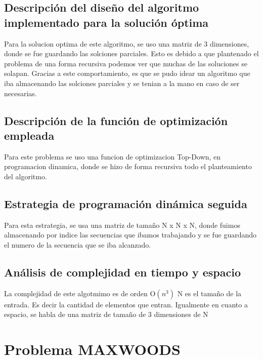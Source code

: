 \documentclass[a4paper,10pt]{article}
\begin{document}
  \subsection{Descripción del diseño del algoritmo implementado para la solución óptima}
  \hspace{2cm}
  Para la solucion optima de este algoritmo, se uso una matriz de 3 dimensiones, donde se fue guardando las solciones parciales. Esto es debido a que plantenado el problema de una forma recursiva podemos ver que muchas de las soluciones se solapan. Gracias a este comportamiento, es que se pudo idear un algoritmo que iba almacenando las solciones parciales y se tenian a la mano en caso de ser necesarias. 


  \subsection{Descripción de la función de optimización empleada}
  \hspace{2cm}
    Para este problema se uso una funcion de optimizacion Top-Down, en programacion dinamica, donde se hizo de forma recursiva todo el planteamiento del algoritmo.
    
  \subsection{Estrategia de programación dinámica seguida}
  \hspace{2cm}
    
Para esta estrategia, se usa una matriz de tamaño N x N x N, donde fuimos almacenando por indice las secuencias que ibamos trabajando y se fue guardando el numero de la secuencia que se iba alcanzado.

  \subsection{Análisis de complejidad en tiempo y espacio}
  \hspace{2cm}
   La complejidad de este algotmimo es de orden O$(n^3)$ N es el tamaño de la entrada. Es decir la cantidad de elementos que entran.
Igualmente en cuanto a espacio, se habla de una matriz de tamaño de 3 dimensiones de N
 


\section{Problema MAXWOODS}
\end{document}
